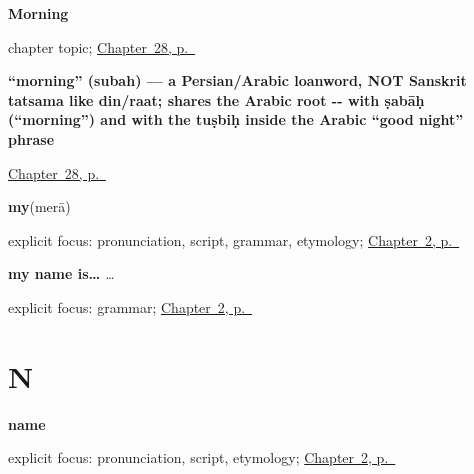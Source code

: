 \noindent\begin{minipage}[t]{\linewidth}
\raggedright
\textbf{Morning}\par
\footnotesize chapter topic; \hyperref[ch:hi-morning]{Chapter~28, p.~\pageref*{ch:hi-morning}}
\end{minipage}\par\smallskip

\noindent\begin{minipage}[t]{\linewidth}
\raggedright
\textbf{\textquotedblleft{}morning\textquotedblright{} (subah) — a Persian/Arabic loanword, NOT Sanskrit tatsama like din/raat; shares the Arabic root -- with ṣabāḥ (\textquotedblleft{}morning\textquotedblright{}) and with the tuṣbiḥ inside the Arabic \textquotedblleft{}good night\textquotedblright{} phrase}\enspace\emph{}\par
\footnotesize \hyperref[ch:hi-morning]{Chapter~28, p.~\pageref*{ch:hi-morning}}
\end{minipage}\par\smallskip

\noindent\begin{minipage}[t]{\linewidth}
\raggedright
\textbf{my}\enspace\emph{}\enspace(merā)\par
\footnotesize explicit focus: pronunciation, script, grammar, etymology; \hyperref[ch:introductions]{Chapter~2, p.~\pageref*{ch:introductions}}
\end{minipage}\par\smallskip

\noindent\begin{minipage}[t]{\linewidth}
\raggedright
\textbf{my name is…}\enspace\emph{  … }\par
\footnotesize explicit focus: grammar; \hyperref[ch:introductions]{Chapter~2, p.~\pageref*{ch:introductions}}
\end{minipage}\par\smallskip

\section*{N}

\noindent\begin{minipage}[t]{\linewidth}
\raggedright
\textbf{name}\enspace\emph{}\par
\footnotesize explicit focus: pronunciation, script, etymology; \hyperref[ch:introductions]{Chapter~2, p.~\pageref*{ch:introductions}}
\end{minipage}\par\smallskip

